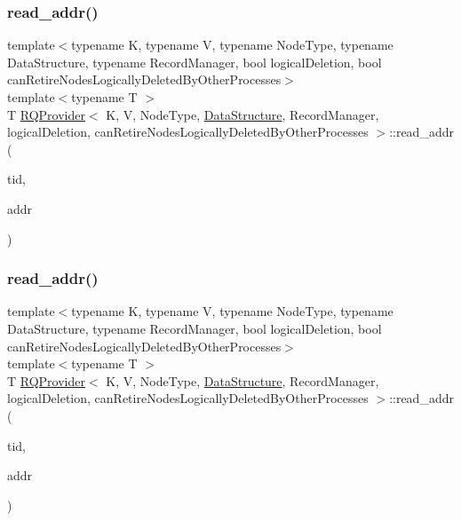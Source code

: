 \mbox{\label{classRQProvider_aa6dcae307b83ce0dc7890155f81659a2}} 
\subsubsection{\texorpdfstring{read\+\_\+addr()}{read\_addr()}\hspace{0.1cm}{\footnotesize\ttfamily [4/5]}}
{\footnotesize\ttfamily template$<$typename K, typename V, typename Node\+Type, typename Data\+Structure, typename Record\+Manager, bool logical\+Deletion, bool can\+Retire\+Nodes\+Logically\+Deleted\+By\+Other\+Processes$>$ \\
template$<$typename T $>$ \\
T \hyperlink{classRQProvider}{R\+Q\+Provider}$<$ K, V, Node\+Type, \hyperlink{classDataStructure}{Data\+Structure}, Record\+Manager, logical\+Deletion, can\+Retire\+Nodes\+Logically\+Deleted\+By\+Other\+Processes $>$\+::read\+\_\+addr (\begin{DoxyParamCaption}\item[{const int}]{tid,  }\item[{T volatile $\ast$const}]{addr }\end{DoxyParamCaption})\hspace{0.3cm}{\ttfamily [inline]}}

\mbox{\label{classRQProvider_aa6dcae307b83ce0dc7890155f81659a2}} 
\subsubsection{\texorpdfstring{read\+\_\+addr()}{read\_addr()}\hspace{0.1cm}{\footnotesize\ttfamily [5/5]}}
{\footnotesize\ttfamily template$<$typename K, typename V, typename Node\+Type, typename Data\+Structure, typename Record\+Manager, bool logical\+Deletion, bool can\+Retire\+Nodes\+Logically\+Deleted\+By\+Other\+Processes$>$ \\
template$<$typename T $>$ \\
T \hyperlink{classRQProvider}{R\+Q\+Provider}$<$ K, V, Node\+Type, \hyperlink{classDataStructure}{Data\+Structure}, Record\+Manager, logical\+Deletion, can\+Retire\+Nodes\+Logically\+Deleted\+By\+Other\+Processes $>$\+::read\+\_\+addr (\begin{DoxyParamCaption}\item[{const int}]{tid,  }\item[{T volatile $\ast$const}]{addr }\end{DoxyParamCaption})\hspace{0.3cm}{\ttfamily [inline]}}

